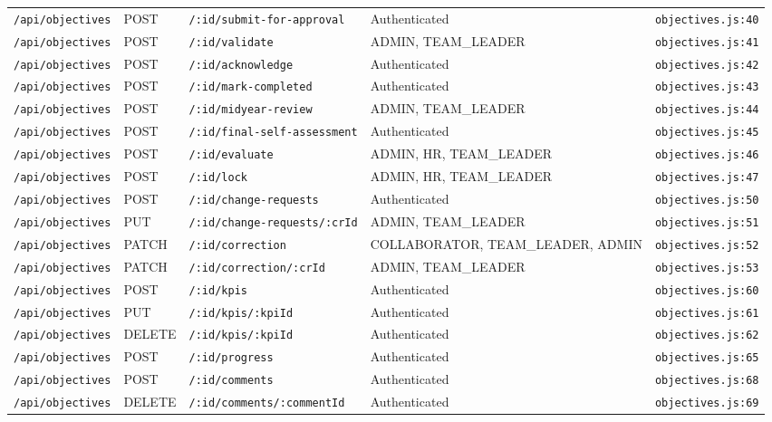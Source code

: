 \begin{landscape}
\begin{longtable}{p{}p{}p{}p{}p{}}
\texttt{/api/objectives} & POST & \texttt{/:id/submit-for-approval} & Authenticated & \texttt{objectives.js:40}\\
\texttt{/api/objectives} & POST & \texttt{/:id/validate} & ADMIN,  TEAM\_LEADER & \texttt{objectives.js:41}\\
\texttt{/api/objectives} & POST & \texttt{/:id/acknowledge} & Authenticated & \texttt{objectives.js:42}\\
\texttt{/api/objectives} & POST & \texttt{/:id/mark-completed} & Authenticated & \texttt{objectives.js:43}\\
\texttt{/api/objectives} & POST & \texttt{/:id/midyear-review} & ADMIN,  TEAM\_LEADER & \texttt{objectives.js:44}\\
\texttt{/api/objectives} & POST & \texttt{/:id/final-self-assessment} & Authenticated & \texttt{objectives.js:45}\\
\texttt{/api/objectives} & POST & \texttt{/:id/evaluate} & ADMIN,  HR,  TEAM\_LEADER & \texttt{objectives.js:46}\\
\texttt{/api/objectives} & POST & \texttt{/:id/lock} & ADMIN,  HR,  TEAM\_LEADER & \texttt{objectives.js:47}\\
\texttt{/api/objectives} & POST & \texttt{/:id/change-requests} & Authenticated & \texttt{objectives.js:50}\\
\texttt{/api/objectives} & PUT & \texttt{/:id/change-requests/:crId} & ADMIN,  TEAM\_LEADER & \texttt{objectives.js:51}\\
\texttt{/api/objectives} & PATCH & \texttt{/:id/correction} & COLLABORATOR,  TEAM\_LEADER,  ADMIN & \texttt{objectives.js:52}\\
\texttt{/api/objectives} & PATCH & \texttt{/:id/correction/:crId} & ADMIN,  TEAM\_LEADER & \texttt{objectives.js:53}\\
\texttt{/api/objectives} & POST & \texttt{/:id/kpis} & Authenticated & \texttt{objectives.js:60}\\
\texttt{/api/objectives} & PUT & \texttt{/:id/kpis/:kpiId} & Authenticated & \texttt{objectives.js:61}\\
\texttt{/api/objectives} & DELETE & \texttt{/:id/kpis/:kpiId} & Authenticated & \texttt{objectives.js:62}\\
\texttt{/api/objectives} & POST & \texttt{/:id/progress} & Authenticated & \texttt{objectives.js:65}\\
\texttt{/api/objectives} & POST & \texttt{/:id/comments} & Authenticated & \texttt{objectives.js:68}\\
\texttt{/api/objectives} & DELETE & \texttt{/:id/comments/:commentId} & Authenticated & \texttt{objectives.js:69}\\

\end{longtable}
\end{landscape}
